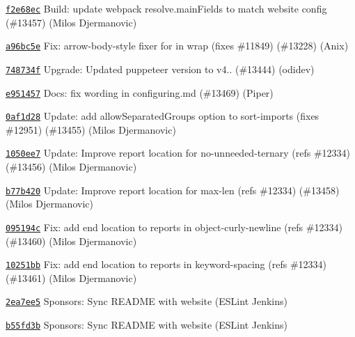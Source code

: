 \begin{DoxyItemize}
\item \href{https://github.com/eslint/eslint/commit/f2e68ec1d6cee6299e8a5cdf76c522c11d3008dd}{\texttt{ {\ttfamily f2e68ec}}} Build\+: update webpack resolve.\+main\+Fields to match website config (\#13457) (Milos Djermanovic)
\item \href{https://github.com/eslint/eslint/commit/a96bc5ec06f3a48bfe458bccd68d4d3b2a280ed9}{\texttt{ {\ttfamily a96bc5e}}} Fix\+: arrow-\/body-\/style fixer for {\ttfamily in} wrap (fixes \#11849) (\#13228) (Anix)
\item \href{https://github.com/eslint/eslint/commit/748734fdd497fbf61f3a616ff4a09169135b9396}{\texttt{ {\ttfamily 748734f}}} Upgrade\+: Updated puppeteer version to v4.. (\#13444) (odidev)
\item \href{https://github.com/eslint/eslint/commit/e951457b7aaa1b12b135588d36e3f4db4d7b8463}{\texttt{ {\ttfamily e951457}}} Docs\+: fix wording in configuring.\+md (\#13469) (Piper)
\item \href{https://github.com/eslint/eslint/commit/0af1d2828d27885483737867653ba1659af72005}{\texttt{ {\ttfamily 0af1d28}}} Update\+: add allow\+Separated\+Groups option to sort-\/imports (fixes \#12951) (\#13455) (Milos Djermanovic)
\item \href{https://github.com/eslint/eslint/commit/1050ee78a95da9484ff333dc1c74dac64c05da6f}{\texttt{ {\ttfamily 1050ee7}}} Update\+: Improve report location for no-\/unneeded-\/ternary (refs \#12334) (\#13456) (Milos Djermanovic)
\item \href{https://github.com/eslint/eslint/commit/b77b4202bd1d5d1306f6f645e88d7a41a51715db}{\texttt{ {\ttfamily b77b420}}} Update\+: Improve report location for max-\/len (refs \#12334) (\#13458) (Milos Djermanovic)
\item \href{https://github.com/eslint/eslint/commit/095194c0fc0eb02aa69fde6b4280696e0e4de214}{\texttt{ {\ttfamily 095194c}}} Fix\+: add end location to reports in object-\/curly-\/newline (refs \#12334) (\#13460) (Milos Djermanovic)
\item \href{https://github.com/eslint/eslint/commit/10251bbaeba80ac15244f385fc42cf2f2a30e5d2}{\texttt{ {\ttfamily 10251bb}}} Fix\+: add end location to reports in keyword-\/spacing (refs \#12334) (\#13461) (Milos Djermanovic)
\item \href{https://github.com/eslint/eslint/commit/2ea7ee51a4e05ee76a6dae5954c3b6263b0970a3}{\texttt{ {\ttfamily 2ea7ee5}}} Sponsors\+: Sync README with website (ESLint Jenkins)
\item \href{https://github.com/eslint/eslint/commit/b55fd3b8c05a29a465a794a524b06c1a28cddf0c}{\texttt{ {\ttfamily b55fd3b}}} Sponsors\+: Sync README with website (ESLint Jenkins)
\end{DoxyItemize}

